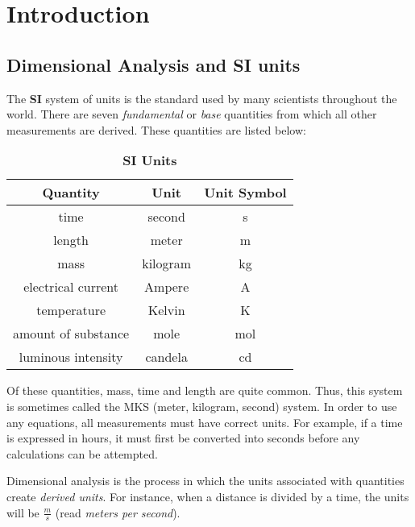 \chapter{Introduction}
\section{Dimensional Analysis and SI units}
The \textbf{SI} system of units is the standard used by many scientists throughout the world.  There are seven \textit{fundamental} or \textit{base} quantities from which all other measurements are derived.  These quantities are listed below:

\begin{center}

	
\begin{table}[ht]\caption{\textbf{SI Units}}%
	\centering %
	\begin{tabular}{|c|c|c|}
		\hline \hline
		\textbf{Quantity} & \textbf{Unit} & \textbf{Unit Symbol}\\
		\hline
		time & second & s \\
		\hline
		length & meter & m \\
		\hline
		mass & kilogram & kg \\
		\hline
		electrical current & Ampere & A \\
		\hline
		temperature & Kelvin & K \\
		\hline
		amount of substance & mole & mol \\
		\hline
		luminous intensity & candela & cd \\
		\hline		
	\end{tabular}
	\label{table:nonlin}%
\end{table}
\end{center}

	Of these quantities, mass, time and length are quite common.  Thus, this system is sometimes called the MKS (meter, kilogram, second) system. In order to use any equations, all measurements must have correct units.  For example, if a time is expressed in hours, it must first be converted into seconds before any calculations can be attempted.  
	
	Dimensional analysis  is the process in which the units associated with quantities create \textit{derived units}.  For instance, when a distance is divided by a time, the units will be $ \frac{m}{s}$ (read \textit{meters per second}).  	
	
